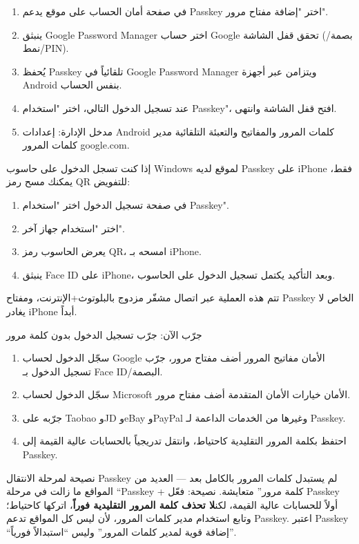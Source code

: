 \begin{enumerate}
  \item في صفحة أمان الحساب على موقع يدعم Passkey اختر "إضافة مفتاح مرور".
  \item ينبثق Google Password Manager اختر حساب Google تحقق قفل الشاشة (بصمة/نمط/PIN).
  \item يُحفظ Passkey تلقائياً في Google Password Manager ويتزامن عبر أجهزة Android بنفس الحساب.
  \item عند تسجيل الدخول التالي، اختر "استخدام Passkey"، افتح قفل الشاشة وانتهى.
  \item مدخل الإدارة: إعدادات Android كلمات المرور والمفاتيح والتعبئة التلقائية مدير كلمات المرور google.com.
\end{enumerate}


إذا كنت تسجل الدخول على حاسوب Windows لموقع لديه Passkey على iPhone فقط، يمكنك مسح رمز QR للتفويض:

\begin{enumerate}
  \item في صفحة تسجيل الدخول اختر "استخدام Passkey".
  \item اختر "استخدام جهاز آخر".
  \item يعرض الحاسوب رمز QR، امسحه بـ iPhone.
  \item ينبثق Face ID على iPhone، وبعد التأكيد يكتمل تسجيل الدخول على الحاسوب.
\end{enumerate}

تتم هذه العملية عبر اتصال مشفّر مزدوج بالبلوتوث+الإنترنت، ومفتاح Passkey الخاص لا يغادر iPhone أبداً.

\begin{tcbpractice}{جرّب الآن: جرّب تسجيل الدخول بدون كلمة مرور}
\begin{enumerate}
  \item سجّل الدخول لحساب Google الأمان مفاتيح المرور أضف مفتاح مرور، جرّب تسجيل الدخول بـ Face ID/البصمة.
  \item سجّل الدخول لحساب Microsoft الأمان خيارات الأمان المتقدمة أضف مفتاح مرور.
  \item جرّبه على Taobao وJD وeBay وPayPal وغيرها من الخدمات الداعمة لـ Passkey.
  \item احتفظ بكلمة المرور التقليدية كاحتياط، وانتقل تدريجياً بالحسابات عالية القيمة إلى Passkey.
\end{enumerate}

\end{tcbpractice}

\begin{tcbwarn}{نصيحة لمرحلة الانتقال}
Passkey لم يستبدل كلمات المرور بالكامل بعد — العديد من المواقع ما زالت في مرحلة “Passkey + كلمة مرور” متعايشة. نصيحة: فعّل Passkey أولاً للحسابات عالية القيمة، لكن\textbf{لا تحذف كلمة المرور التقليدية فوراً}، اتركها كاحتياط؛ وتابع استخدام مدير كلمات المرور، لأن ليس كل المواقع تدعم Passkey. اعتبر Passkey “إضافة قوية لمدير كلمات المرور” وليس “استبدالاً فورياً”.

\end{tcbwarn}

